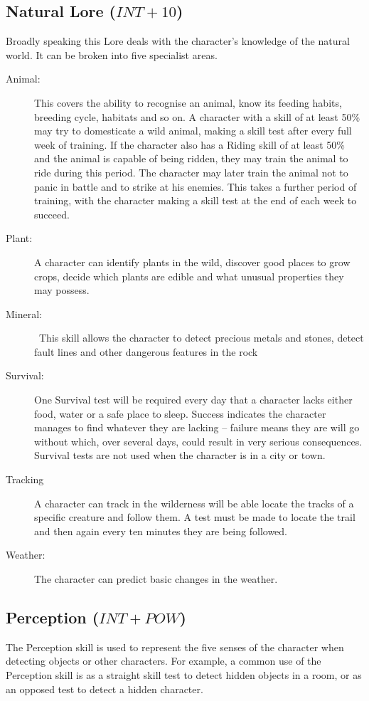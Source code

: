 \subsection{Natural Lore ($INT+10$)}
Broadly speaking this Lore deals with the character’s knowledge of the natural world. It can be broken into five specialist areas.
\begin{description}
	\item[Animal:] This covers the ability to recognise an animal, know its feeding habits, breeding cycle, habitats and so on. A character with a skill of at least 50\% may try to domesticate a wild animal, making a skill test after every full week of training. If the character also has a Riding skill of at least 50\% and the animal is capable of being ridden, they may train the animal to ride during this period. The character may later train the animal not to panic in battle and to strike at his enemies. This takes a further period of training, with the character making a skill test at the end of each week to succeed. 
	\item[Plant:] A character can identify plants in the wild, discover good places to grow crops, decide which plants are edible and what unusual properties they may possess. 
	\item[Mineral:]  This skill allows the character to detect precious metals and stones, detect fault lines and other dangerous features in the rock
	\item[Survival:] One Survival test will be required every day that a character lacks either food, water or a safe place to sleep. Success indicates the character manages to find whatever they are lacking – failure means they are will go without which, over several days, could result in very serious consequences. Survival tests are not used when the character is in a city or town. 
	\item[Tracking] A character can track in the wilderness will be able locate the tracks of a specific creature and follow them. A test must be made to locate the trail and then again every ten minutes they are being followed. 
	\item[Weather:] The character can predict basic changes in the weather.
\end{description}

\subsection{Perception ($INT+POW$)}
The Perception skill is used to represent the five senses of the character when detecting objects or other characters. For example, a common use of the Perception skill is as a straight skill test to detect hidden objects in a room, or as an opposed test to detect a hidden character.

